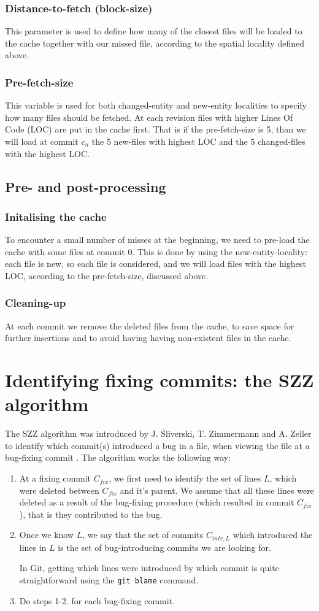 \documentclass[12pt,twoside,notitlepage]{report}
\begin{document}
\subsubsection{Distance-to-fetch (block-size)}
This parameter is used to define how many of the closest files will be loaded to the cache together with our missed file, according to the spatial locality defined above.

\subsubsection{Pre-fetch-size}
This variable is used for both changed-entity and new-entity localities to specify how many files should be fetched. At each revision files with higher Lines Of Code (LOC) are put in the cache first. That is if the pre-fetch-size is 5, than we will load at commit $c_n$ the 5 new-files with highest LOC and the 5 changed-files with the highest LOC.
\subsection{Pre- and post-processing}
\subsubsection{Initalising the cache}
To encounter a small number of misses at the beginning, we need to pre-load the cache with some files at commit $0$. This is done by using the new-entity-locality: each file is new, so each file is considered, and we will load files with the highest LOC, according to the pre-fetch-size, discussed above.
\subsubsection{Cleaning-up}
At each commit we remove the deleted files from the cache, to save space for further insertions and to avoid having having non-existent files in the cache.
\section{Identifying fixing commits: the SZZ algorithm}\label{szz}
The SZZ algorithm was introduced by J. \'Sliverski, T. Zimmermann and A. Zeller to identify which commit(s) introduced a bug in a file, when viewing the file at a bug-fixing commit \cite{SZZ}. The algorithm works the following way:
\begin{enumerate}
\item At a fixing commit $C_{fix}$, we first need to identify the set of lines $L$, which were deleted between $C_{fix}$ and it's parent. We assume that all these lines were deleted as a result of the bug-fixing procedure (which resulted in commit $C_{fix}$), that is they contributed to the bug.
\item Once we know $L$, we say that the set of commits $C_{intr,L}$ which introduced the lines in $L$ is the set of bug-introducing commits we are looking for.

In Git, getting which lines were introduced by which commit is quite straightforward using the \texttt{git blame} command.
\item Do steps 1-2. for each bug-fixing commit.
\end{enumerate}
\end{document}

